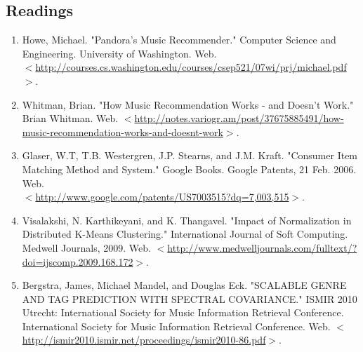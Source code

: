 \documentclass[12pt]{article}
\begin{document}
\subsection{Readings}
\label{subsec:readings}
\begin{enumerate}
    \item Howe, Michael. "Pandora's Music Recommender." Computer Science and Engineering. University of Washington. Web.\\ $<$\href{http://courses.cs.washington.edu/courses/csep521/07wi/prj/michael.pdf}{http://courses.cs.washington.edu/courses/csep521/07wi/prj/michael.pdf}$>$.\vspace{-1ex}
    
    \item Whitman, Brian. "How Music Recommendation Works - and Doesn't Work." Brian Whitman. Web. $<$\href{http://notes.variogr.am/post/37675885491/how-music-recommendation-works-and-doesnt-work}{http://notes.variogr.am/post/37675885491/how-music-recommendation-works-and-doesnt-work}$>$.\vspace{-1ex}

    \item Glaser, W.T, T.B. Westergren, J.P. Stearns, and J.M. Kraft. "Consumer Item Matching Method and System." Google Books. Google Patents, 21 Feb. 2006. Web.\\ $<$\href{http://www.google.com/patents/US7003515?dq=7,003,515}{http://www.google.com/patents/US7003515?dq=7,003,515}$>$.\vspace{-1ex}
    
    \item Visalakshi, N. Karthikeyani, and K. Thangavel. "Impact of Normalization in Distributed K-Means Clustering." International Journal of Soft Computing. Medwell Journals, 2009. Web. $<$\href{http://www.medwelljournals.com/fulltext/?doi=ijscomp.2009.168.172}{http://www.medwelljournals.com/fulltext/?doi=ijscomp.2009.168.172}$>$.\vspace{-1ex}
    
    \item Bergstra, James, Michael Mandel, and Douglas Eck. "SCALABLE GENRE AND TAG PREDICTION WITH SPECTRAL COVARIANCE." ISMIR 2010 Utrecht: International Society for Music Information Retrieval Conference. International Society for Music Information Retrieval Conference. Web. $<$\href{http://ismir2010.ismir.net/proceedings/ismir2010-86.pdf}{http://ismir2010.ismir.net/proceedings/ismir2010-86.pdf}$>$.\vspace{-1ex}
    

\end{enumerate}
\end{document}
